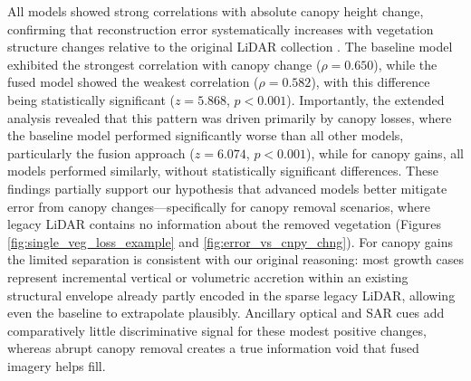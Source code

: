 \documentclass[remotesensing,article,accept,pdftex,moreauthors]{Definitions/mdpi}
\begin{document}
All models showed strong correlations with absolute canopy height change, confirming that reconstruction error systematically increases with vegetation structure changes relative to the original LiDAR collection%
. The baseline model exhibited the strongest correlation with canopy change ($\rho=0.650$), while the fused model showed the weakest correlation ($\rho=0.582$), with this difference being statistically significant ($z=5.868$, $p<0.001$). Importantly, the extended analysis revealed that this pattern was driven primarily by canopy losses, where the baseline model performed significantly worse than all other models, particularly the fusion approach ($z=6.074$, $p<0.001$), while for canopy gains, all models performed similarly, without statistically significant differences. These findings partially support our hypothesis that advanced models better mitigate error from canopy changes---specifically for canopy removal scenarios, where legacy LiDAR contains no information about the removed vegetation (Figures \ref{fig:single_veg_loss_example} and \ref{fig:error_vs_cnpy_chng}). For canopy gains the limited separation is consistent with our original reasoning: most growth cases represent incremental vertical or volumetric accretion within an existing structural envelope already partly encoded in the sparse legacy LiDAR, allowing even the baseline to extrapolate plausibly. Ancillary optical and SAR cues add comparatively little discriminative signal for these modest positive changes, whereas abrupt canopy removal creates a true information void that fused imagery helps fill.


\vspace{-3pt}
\end{document}

